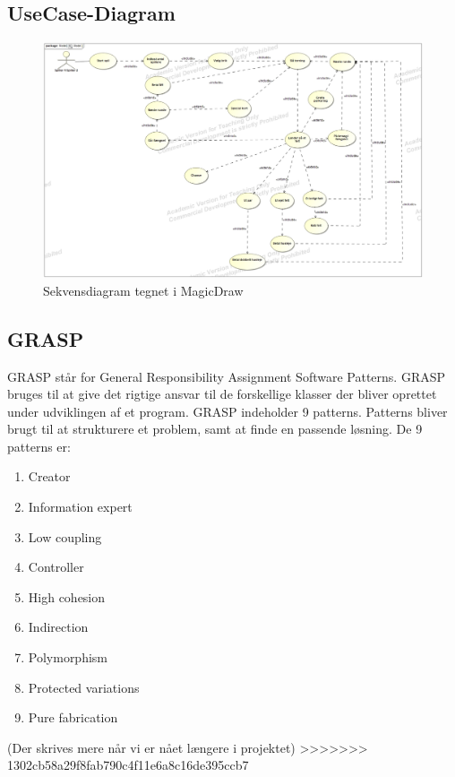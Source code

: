\subsection{UseCase-Diagram}
    \begin{figure}[h]
        \advance\leftskip-3cm
        \includegraphics[width=20cm]{fig/UC-cdio3.jpg}
        \caption{Sekvensdiagram tegnet i MagicDraw}
    \end{figure}
\subsection{GRASP}
    GRASP står for General Responsibility Assignment Software Patterns. GRASP bruges til at give det rigtige ansvar til de forskellige klasser der bliver oprettet under udviklingen af et program. GRASP indeholder 9 patterns. Patterns bliver brugt til at strukturere et problem, samt at finde en passende løsning. De 9 patterns er:
    \begin{enumerate}
        \item Creator
        \item Information expert
        \item Low coupling
        \item Controller
        \item High cohesion
        \item Indirection
        \item Polymorphism
        \item Protected variations
        \item Pure fabrication
    \end{enumerate}
    (Der skrives mere når vi er nået længere i projektet)
>>>>>>> 1302cb58a29f8fab790c4f11e6a8c16de395ccb7
